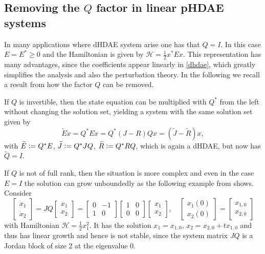 \documentclass[11pt]{article}
\begin{document}
\subsection{Removing the \texorpdfstring{$Q$}{Q} factor in linear pHDAE systems}
\label{sec:noQ}
%
In many applications where dHDAE system arise one has that $Q = I$. In this case $E=E^*\geq 0 $ and  the Hamiltonian is given by $\mathcal H=\frac 12 x^*Ex$. This representation has many advantages, since the coefficients appear linearly in \eqref{dhdae}, which greatly simplifies the analysis and also the perturbation theory. In the following we recall a result from \cite{MehU23} how the factor $Q$ can be removed.

If $Q$ is invertible, then the state equation can be  multiplied with $Q^*$ from the left without changing the solution set, yielding a system with the same solution set given by
%
\begin{equation}\label{mwithQ}
	\widetilde{E}\dot x=Q^* E\dot x = Q^* (J-R)Q x=
 (\widetilde{J}-\widetilde{R})x,   \end{equation}
%
with
$\widetilde{E} \vcentcolon= Q^* E$,
$\widetilde{J} \vcentcolon=Q^* JQ$, $\widetilde{R} \vcentcolon= Q^* R Q$, which
is again a dHDAE, but now has $\widetilde{Q}=I$.

If $Q$ is not of full rank, then the situation is more complex and even in the case $E=I$ the solution can grow unboundedly as the following example from \cite{MehMW18} shows. Consider
%
\begin{displaymath}
    \begin{bmatrix} \dot{x}_1 \\ \dot{x}_2 \end{bmatrix} = JQ\begin{bmatrix}x_1\\x_2\end{bmatrix} = \begin{bmatrix} 0&-1\\ 1&0\end{bmatrix}\begin{bmatrix} 1&0\\ 0&0\end{bmatrix} \begin{bmatrix}x_1\\x_2\end{bmatrix},\quad
    \begin{bmatrix}x_1(0)\\x_2(0)\end{bmatrix} = \begin{bmatrix}x_{1,0}\\x_{2,0}\end{bmatrix}
\end{displaymath}
%
with Hamiltonian $\mathcal H=\tfrac {1}{2} x_1^2$. It has the solution $x_1=x_{1,0}$, $x_2=x_{2,0} +t x_{1,0}$ and thus has linear growth and hence is not stable, since the system matrix $JQ$ is a Jordan block of size $2$ at the eigenvalue $0$.
\end{document}
